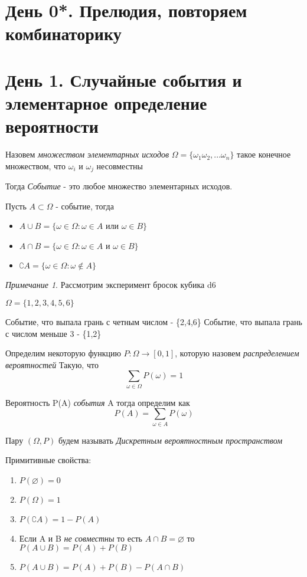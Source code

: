 \documentclass{article}
\theoremstyle{definition}
\theoremstyle{remark}
\newtheorem*{remark}{Примечание}
\begin{document}
\tableofcontents


\section{День 0*. Прелюдия, повторяем комбинаторику}

\section{День 1. Случайные события и элементарное определение вероятности}

Назовем \textit{множеством элементарных исходов} $\varOmega = \{\omega_1\omega_2,...\omega_n \}$ такое конечное множеством, 
что $\omega_i$ и $\omega_j$ несовместны

Тогда \textit{Событие} - это любое множество элементарных исходов. 

Пусть $A \subset \varOmega$ - событие, тогда
\begin{itemize}
    \item $ A \cup B = \{\omega \in \varOmega : \omega \in A$ или $ \omega \in B\} $ 
    \item  $ A \cap B = \{\omega \in \varOmega : \omega \in A$ и $ \omega \in B\} $ 
    \item $ \complement{A} = \{ \omega \in \varOmega : \omega \notin A \} $
\end{itemize}

\begin{remark}

Рассмотрим эксперимент бросок кубика d6 

$\varOmega = \{1,2,3,4,5,6\}$

Событие, что выпала грань с четным числом - \{2,4,6\}
Событие, что выпала грань с числом меньше 3 - \{1,2\}

\end{remark}

Определим некоторую функцию $P: \varOmega \to [0,1]$, которую назовем 
\textit{распределением вероятностей}
Такую, что 
$$
\sum_{\omega \in \varOmega} P(\omega)  = 1
$$

Вероятность P(A) \textit{события} A тогда определим как 
$$
P(A) = \sum_{\omega \in A} P(\omega)  
$$

Пару $(\varOmega, P)$ будем называть \textit{Дискретным вероятностным пространством}



Примитивные свойства:

\begin{enumerate}
 \item $ P(\varnothing) = 0 $
 \item $ P(\varOmega) = 1 $
 \item $P(\complement{A}) = 1 - P(A)$
 \item Если A и B \textit{не совместны} то есть $A \cap B = \varnothing$ то $ P(A \cup B) = P(A) + P(B) $
 \item $ P(A \cup B) = P(A) + P(B) - P(A \cap B) $
\end{enumerate}
\end{document}
